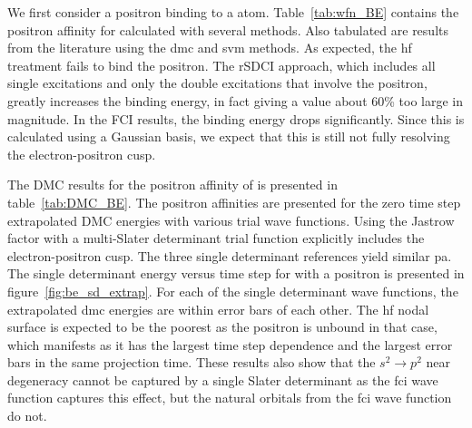 We first consider a positron binding to a  atom. 
Table~\ref{tab:wfn_BE} contains the positron affinity for  calculated with several methods.
Also tabulated are results from the literature using the \gls{dmc} and \gls{svm} methods.
As expected, the \gls{hf} treatment fails to bind the positron.
The \gls{rSDCI} approach, which includes all single excitations and only the double excitations that involve the positron, greatly increases the binding energy, in fact giving a value about 60\% too large in magnitude.
In the FCI results, the binding energy drops significantly.
Since this is calculated using a Gaussian basis, we expect that this is still not fully resolving the electron-positron cusp.

The DMC results for the positron affinity of  is presented in table~\ref{tab:DMC_BE}.
The positron affinities are presented for the zero time step extrapolated DMC energies with various trial wave functions.
Using the Jastrow factor with a multi-Slater determinant trial function explicitly includes the electron-positron cusp.
The three single determinant references yield similar \gls{pa}.
The single determinant energy versus time step for  with a positron is presented in figure~\ref{fig:be_sd_extrap}.
For each of the single determinant wave functions, the extrapolated \gls{dmc} energies are within error bars of each other.
The \gls{hf} nodal surface is expected to be the poorest as the positron is unbound in that case, which manifests as it has the largest time step dependence and the largest error bars in the same projection time.
These results also show that the $s^2 \rightarrow p^2$ near degeneracy cannot be captured by a single Slater determinant as the \gls{fci} wave function captures this effect, but the natural orbitals from the \gls{fci} wave function do not.

